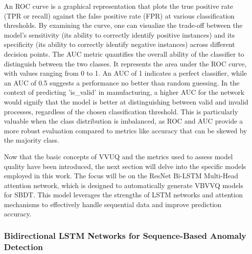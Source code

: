 An ROC curve is a graphical representation that plots the true positive rate (TPR or recall) against the false positive rate (FPR) at various classification thresholds. By examining the curve, one can visualize the trade-off between the model's sensitivity (its ability to correctly identify positive instances) and its specificity (its ability to correctly identify negative instances) across different decision points. The AUC metric quantifies the overall ability of the classifier to distinguish between the two classes. It represents the area under the ROC curve, with values ranging from 0 to 1. An AUC of 1 indicates a perfect classifier, while an AUC of 0.5 suggests a performance no better than random guessing. In the context of predicting 'is\_valid' in manufacturing, a higher AUC for the network would signify that the model is better at distinguishing between valid and invalid processes, regardless of the chosen classification threshold. This is particularly valuable when the class distribution is imbalanced, as ROC and AUC provide a more robust evaluation compared to metrics like accuracy that can be skewed by the majority class.

Now that the basic concepts of VVUQ and the metrics used to assess model quality have been introduced, the next section will delve into the specific models employed in this work. The focus will be on the ResNet Bi-LSTM Multi-Head attention network, which is designed to automatically generate VBVVQ models for SBDT. This model leverages the strengths of LSTM networks and attention mechanisms to effectively handle sequential data and improve prediction accuracy.
\subsubsection*{Bidirectional LSTM Networks for Sequence-Based Anomaly Detection}

